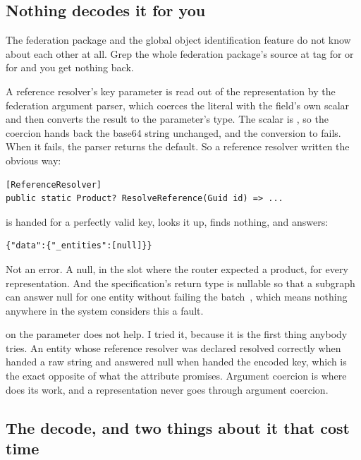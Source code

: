 \subsection*{Nothing decodes it for you}

%
The federation package and the global object identification feature do not know
about each other at all. Grep the whole federation package's source at tag
 for  or for  and you get nothing back.

A reference resolver's key parameter is read out of the representation by the
federation argument parser, which coerces the literal with the field's own
scalar and then converts the result to the parameter's type.
The scalar is , so the coercion hands back the base64 string unchanged,
and the conversion to  fails. When it fails, the parser returns the
default. So a reference resolver written the obvious way:

\begin{verbatim}
[ReferenceResolver]
public static Product? ResolveReference(Guid id) => ...
\end{verbatim}

is handed  for a perfectly valid key, looks it up, finds
nothing, and answers:

\begin{verbatim}
{"data":{"_entities":[null]}}
\end{verbatim}

%
Not an error. A null, in the slot where the router expected a product, for every
representation. And the specification's \code{[\_Entity]} return type is
nullable so that a subgraph can answer null for one entity without failing the
batch~\autocite{apollo2026subgraphspec}, which means nothing anywhere in the
system considers this a fault.

\code{[ID]} on the parameter does not help. I tried it, because it is the first
thing anybody tries. An entity whose reference resolver was declared
 resolved correctly when handed a raw
 string and answered null when handed the encoded key, which is the
exact opposite of what the attribute promises. Argument coercion is where
\code{[ID]} does its work, and a representation never goes through argument
coercion.

\subsection*{The decode, and two things about it that cost time}

